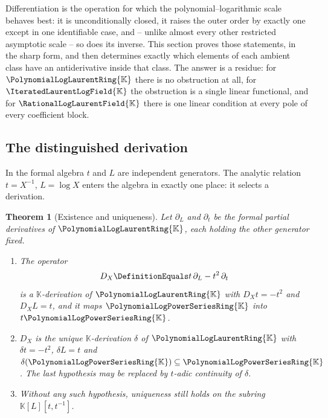 \documentclass[11pt,oneside]{article}
\theoremstyle{plain}
\newtheorem{theorem}{Theorem}[section]
\theoremstyle{definition}
\theoremstyle{remark}
\newcommand{\K}{\mathbb{K}}
\newcommand{\PLpow}{\PolynomialLogPowerSeriesRing{\K}}   %
\newcommand{\PLlau}{\PolynomialLogLaurentRing{\K}}       %
\newcommand{\PLrat}{\RationalLogLaurentField{\K}}        %
\newcommand{\PLit}{\IteratedLaurentLogField{\K}}         %
\newcommand{\DX}{D_{X}}                                  %
\begin{document}
Differentiation is the operation for which the polynomial--logarithmic scale
behaves best: it is unconditionally closed, it raises the outer order by
exactly one except in one identifiable case, and -- unlike almost every other
restricted asymptotic scale -- so does its inverse.  This section proves those
statements, in the sharp form, and then determines exactly which elements of
each ambient class have an antiderivative inside that class.  The answer is a
residue: for \(\PLlau\) there is no obstruction at all, for \(\PLit\) the
obstruction is a single linear functional, and for \(\PLrat\) there is one
linear condition at every pole of every coefficient block.

\subsection{The distinguished derivation}
\label{plt:sec:dif-derivation}

In the formal algebra \(t\) and \(L\) are independent generators.  The analytic
relation \(t=X^{-1}\), \(L=\log X\) enters the algebra in exactly one place: it
selects a derivation.

\begin{theorem}[Existence and uniqueness]\label{plt:thm:dif-derivation}
Let \(\partial_{L}\) and \(\partial_{t}\) be the formal partial derivatives of
\(\PLlau\), each holding the other generator fixed.
\begin{enumerate}
\item The operator
\begin{equation}\label{plt:eq:dif-DX-definition}
  \DX\DefinitionEquals t\,\partial_{L}-t^{2}\,\partial_{t}
\end{equation}
is a \(\K\)-derivation of \(\PLlau\) with \(\DX t=-t^{2}\) and \(\DX L=t\),
and it maps \(\PLpow\) into \(t\PLpow\).
\item \(\DX\) is the unique \(\K\)-derivation \(\delta\) of \(\PLlau\) with
      \(\delta t=-t^{2}\), \(\delta L=t\) and \(\delta(\PLpow)\subseteq
      \PLpow\).  The last hypothesis may be replaced by \(t\)-adic continuity
      of \(\delta\).
\item Without any such hypothesis, uniqueness still holds on the subring
      \(\K[L][t,t^{-1}]\).
\end{enumerate}
\end{theorem}
\end{document}
